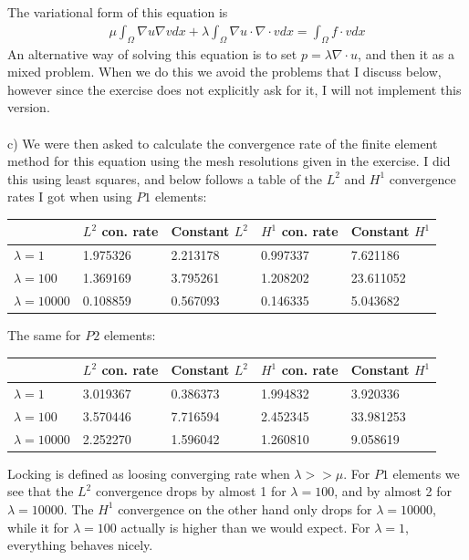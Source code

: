 \documentclass[11pt,a4paper]{report}
\begin{document}
\\
\\
The variational form of this equation is
\begin{align*}
\mu\int_{\Omega} \nabla u\nabla v dx + \lambda\int_{\Omega} \nabla u\cdot\nabla\cdot v dx = \int_{\Omega} f\cdot v dx
\end{align*}
An alternative way of solving this equation is to set $p=\lambda\nabla\cdot u$, and then it as a mixed problem. When we do this we avoid the problems that I discuss below, however since the exercise does not explicitly ask for it, I will not implement this version.
\\
\\
c) We were then asked to calculate the convergence rate of the finite element method for this equation using the mesh resolutions given in the exercise. I did this using least squares, and below follows a table of the $L^2$ and $H^1$ convergence rates I got when using $P1$ elements:
\begin{center}
    \begin{tabular}{| l | l | l | l | l |}
    \hline
     & $L^2$ con. rate& Constant $L^2$ & $H^1$ con. rate& Constant $H^1$\\ \hline
     $\lambda=1$& 1.975326 & 2.213178 & 0.997337& 7.621186 \\ \hline
     $\lambda=100$& 1.369169 & 3.795261& 1.208202& 23.611052\\ \hline
     $\lambda=10000$& 0.108859 & 0.567093 & 0.146335 & 5.043682 \\ \hline
    \end{tabular}
\end{center}
The same for $P2$ elements:
\begin{center}
    \begin{tabular}{| l | l | l | l | l |}
    \hline
    & $L^2$ con. rate& Constant $L^2$ & $H^1$ con. rate& Constant $H^1$\\ \hline
     $\lambda=1$& 3.019367 & 0.386373 & 1.994832& 3.920336 \\ \hline
     $\lambda=100$& 3.570446 & 7.716594 & 2.452345& 33.981253 \\ \hline
     $\lambda=10000$& 2.252270 & 1.596042 & 1.260810& 9.058619 \\ \hline
    \end{tabular}
\end{center}
Locking is defined as loosing converging rate when $\lambda>>\mu$. For $P1$ elements we see that the $L^2$ convergence drops by almost 1 for $\lambda=100$, and by almost 2 for  $\lambda=10000$. The $H^1$ convergence on the other hand only drops for $\lambda=10000$, while it for $\lambda=100$ actually is higher than we would expect. For $\lambda=1$, everything behaves nicely.
\end{document}
